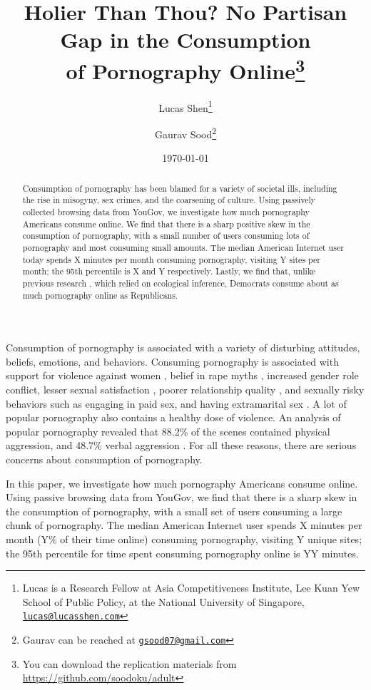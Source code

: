 \documentclass[12pt, letterpaper]{article}
\title{\Large{Holier Than Thou? No Partisan Gap in the Consumption\\ of Pornography Online}\footnote{You can download the replication materials from \href{http://github.com/soodoku/adult}{https://github.com/soodoku/adult}}}
\author{Lucas Shen\thanks{Lucas is a Research Fellow at Asia Competitiveness Institute, Lee Kuan Yew School of Public Policy, at the National University of Singapore, \href{mailto:lucas@lucasshen.com}{\footnotesize{\texttt{lucas@lucasshen.com}}}} \and Gaurav Sood\thanks{Gaurav can be reached at \href{mailto:gsood07@gmail.com}{\footnotesize{\texttt{gsood07@gmail.com}}}}\vspace{.5cm}}
\date{\today}
\begin{document}
\maketitle

\begin{abstract}
\noindent Consumption of pornography has been blamed for a variety of societal ills, including the rise in misogyny, sex crimes, and the coarsening of culture. Using passively collected browsing data from YouGov, we investigate how much pornography Americans consume online. We find that there is a sharp positive skew in the consumption of pornography, with a small number of users consuming lots of pornography and most consuming small amounts. The median American Internet user today spends X minutes per month consuming pornography, visiting Y sites per month; the 95th percentile is X and Y respectively. Lastly, we find that, unlike previous research \citep{macinnis2015american, edelman2009markets}, which relied on ecological inference, Democrats consume about as much pornography online as Republicans.
\end{abstract} 
\clearpage
\doublespace

Consumption of pornography is associated with a variety of disturbing attitudes, beliefs, emotions, and behaviors. Consuming pornography is associated with support for violence against women \citep{hald2010pornography, malamuth2012pornography, donnerstein1984pornography}, belief in rape myths \citep{foubert2011pornography}, increased gender role conflict, lesser sexual satisfaction \citep{szymanski2014psychological, stewart2012young}, poorer relationship quality \citep{szymanski2014psychological, szymanski2015male}, and sexually risky behaviors such as engaging in paid sex, and having extramarital sex \citep{wright2012internet}. A lot of popular pornography also contains a healthy dose of violence. An analysis of popular pornography revealed that 88.2\% of the scenes contained physical aggression, and 48.7\% verbal aggression \citep{bridges2010aggression}. For all these reasons, there are serious concerns about consumption of pornography.

In this paper, we investigate how much pornography Americans consume online. Using passive browsing data from YouGov, we find that there is a sharp skew in the consumption of pornography, with a small set of users consuming a large chunk of pornography. The median American Internet user spends X minutes per month (Y\% of their time online) consuming pornography, visiting Y unique sites; the 95th percentile for time spent consuming pornography online is YY minutes.
\end{document}
